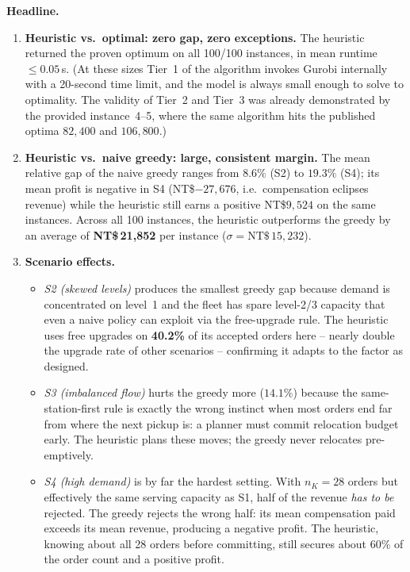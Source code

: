 \documentclass[a4paper,12pt]{article}
\begin{document}
\noindent\textbf{Headline.}
\begin{enumerate}[label=(\arabic*)]
    \item \textbf{Heuristic vs.\ optimal: zero gap, zero exceptions.}
    The heuristic returned the proven optimum on all 100/100 instances,
    in mean runtime $\le 0.05$\,s. (At these sizes Tier~1 of the algorithm
    invokes Gurobi internally with a 20-second time limit, and the model
    is always small enough to solve to optimality. The validity of
    Tier~2 and Tier~3 was already demonstrated by the provided
    instance~4--5, where the same algorithm hits the published optima
    $82{,}400$ and $106{,}800$.)

    \item \textbf{Heuristic vs.\ naive greedy: large, consistent margin.}
    The mean relative gap of the naive greedy ranges from $8.6\%$
    (S2) to $19.3\%$ (S4); its mean profit is negative in S4
    (NT\$$-27{,}676$, i.e.\ compensation eclipses revenue) while the
    heuristic still earns a positive NT\$$9{,}524$ on the same instances.
    Across all 100 instances, the heuristic outperforms the greedy by an
    average of \textbf{NT\$\,21{,}852} per instance ($\sigma=\textrm{NT\$}\,15{,}232$).

    \item \textbf{Scenario effects.}
    \begin{itemize}
        \item \emph{S2 (skewed levels)} produces the smallest greedy gap
        because demand is concentrated on level~1 and the fleet has spare
        level-2/3 capacity that even a naive policy can exploit via the
        free-upgrade rule. The heuristic uses free upgrades on
        \textbf{40.2\%} of its accepted orders here -- nearly double the
        upgrade rate of other scenarios -- confirming it adapts to the
        factor as designed.
        \item \emph{S3 (imbalanced flow)} hurts the greedy more
        ($14.1\%$) because the same-station-first rule is exactly the wrong
        instinct when most orders end far from where the next pickup is:
        a planner must commit relocation budget early. The heuristic
        plans these moves; the greedy never relocates pre-emptively.
        \item \emph{S4 (high demand)} is by far the hardest setting. With
        $n_K = 28$ orders but effectively the same serving capacity as
        S1, half of the revenue \emph{has to be} rejected. The greedy
        rejects the wrong half: its mean compensation paid exceeds its
        mean revenue, producing a negative profit. The heuristic,
        knowing about all 28 orders before committing, still secures
        about 60\% of the order count and a positive profit.
    \end{itemize}
\end{enumerate}
\end{document}
